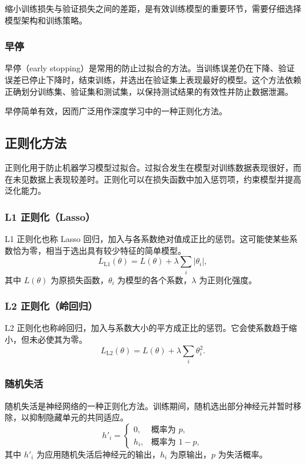 缩小训练损失与验证损失之间的差距，是有效训练模型的重要环节，需要仔细选择模型架构和训练策略。

\subsubsection{早停}
早停（early stopping）是常用的防止过拟合的方法。当训练误差仍在下降、验证误差已停止下降时，结束训练，并选出在验证集上表现最好的模型。这个方法依赖正确划分训练集、验证集和测试集，以保持测试结果的有效性并防止数据泄漏。

早停简单有效，因而广泛用作深度学习中的一种正则化方法。

\subsection{正则化方法}
\label{sec:appa-regularization}
正则化用于防止机器学习模型过拟合。过拟合发生在模型对训练数据表现很好，而在未见数据上表现较差时。正则化可以在损失函数中加入惩罚项，约束模型并提高泛化能力。

\subsubsection{L1 正则化（Lasso）}
L1 正则化也称 Lasso 回归，加入与各系数绝对值成正比的惩罚。这可能使某些系数恰为零，相当于选出具有较少特征的简单模型。
\begin{equation}
L_{\mathrm{L1}}(\theta)=L(\theta)+\lambda\sum_i|\theta_i|,
\label{eq:appa-l1}
\end{equation}
其中 $L(\theta)$ 为原损失函数，$\theta_i$ 为模型的各个系数，$\lambda$ 为正则化强度。

\subsubsection{L2 正则化（岭回归）}
L2 正则化也称岭回归，加入与系数大小的平方成正比的惩罚。它会使系数趋于缩小，但未必使其为零。
\begin{equation}
L_{\mathrm{L2}}(\theta)=L(\theta)+\lambda\sum_i\theta_i^2.
\label{eq:appa-l2}
\end{equation}

\subsubsection{随机失活}
随机失活是神经网络的一种正则化方法。训练期间，随机选出部分神经元并暂时移除，以抑制隐藏单元的共同适应。
\begin{equation}
h'_i=
\begin{cases}
0,&\text{概率为 }p,\\
h_i,&\text{概率为 }1-p,
\end{cases}
\label{eq:appa-dropout}
\end{equation}
其中 $h'_i$ 为应用随机失活后神经元的输出，$h_i$ 为原输出，$p$ 为失活概率。

